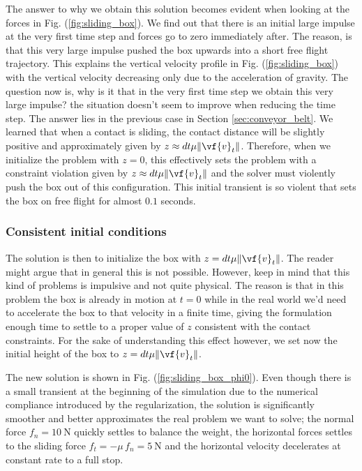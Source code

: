 The answer to why we obtain this solution becomes evident when looking at the
forces in Fig. (\ref{fig:sliding_box}). We find out that there is an initial
large impulse at the very first time step and forces go to zero immediately
after. The reason, is that this very large impulse pushed the box upwards into a
short free flight trajectory. This explains the vertical velocity profile in
Fig. (\ref{fig:sliding_box}) with the vertical velocity decreasing only due to
the acceleration of gravity. The question now is, why is it that in the very
first time step we obtain this very large impulse? the situation doesn't seem to
improve when reducing the time step. The answer lies in the previous case in
Section \ref{sec:conveyor_belt}. We learned that when a contact is sliding, the
contact distance will be slightly positive and approximately given by $z\approx
dt\mu\Vert\vf{v}_t\Vert$. Therefore, when we initialize the problem with $z=0$,
this effectively sets the problem with a constraint violation given by $z\approx
dt\mu\Vert\vf{v}_t\Vert$ and the solver must violently push the box out of this
configuration. This initial transient is so violent that sets the box on free
flight for almost $0.1$ seconds.

\subsubsection{Consistent initial conditions}
The solution is then to initialize the box with $z= dt\mu\Vert\vf{v}_t\Vert$.
The reader might argue that in general this is not possible. However, keep in
mind that this kind of problems is impulsive and not quite physical. The reason
is that in this problem the box is already in motion at $t=0$ while in the real
world we'd need to accelerate the box to that velocity in a finite time, giving
the formulation enough time to settle to a proper value of $z$ consistent with
the contact constraints. For the sake of understanding this effect however, we
set now the initial height of the box to $z= dt\mu\Vert\vf{v}_t\Vert$.

The new solution is shown in Fig. (\ref{fig:sliding_box_phi0}). Even though
there is a small transient at the beginning of the simulation due to the
numerical compliance introduced by the regularization, the solution is
significantly smoother and better approximates the real problem we want to
solve; the normal force $f_n=10~\text{N}$ quickly settles to balance the weight,
the horizontal forces settles to the sliding force $f_t=-\mu\,f_n=5~\text{N}$
and the horizontal velocity decelerates at constant rate to a full stop.

